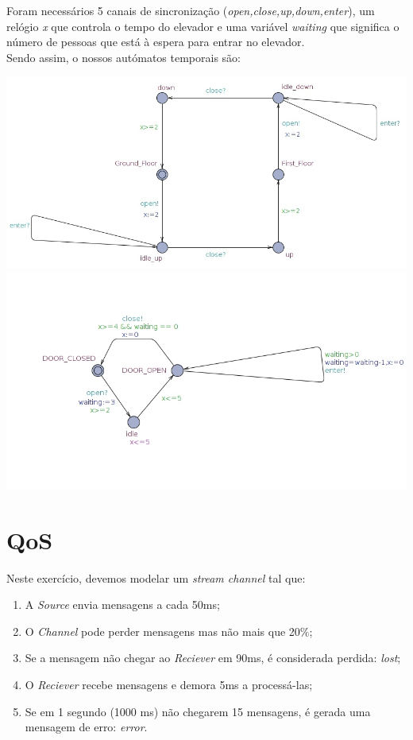 \documentclass[12pt]{article} %
\begin{document}
Foram necessários 5 canais de sincronização ({\it{open,close,up,down,enter}}), um relógio {\it{x}} que controla o tempo do elevador e uma variável {\it{waiting}} que significa o número de pessoas que está à espera para entrar no elevador.
\\
Sendo assim, o nossos autómatos temporais são:
\begin{center}
\includegraphics[scale=0.4]{elevator.jpg}
\includegraphics[scale=0.4]{door.jpg}
\end{center}


\section{QoS} 

Neste exercício, devemos modelar um {\it{stream channel}} tal que:
\begin{enumerate}
\item A {\it{Source}} envia mensagens a cada 50ms;
\item O {\it{Channel}} pode perder mensagens mas não mais que 20$\%$;
\item Se a mensagem não chegar ao {\it{Reciever}} em 90ms, é considerada perdida: {\it{lost}};
\item O {\it{Reciever}} recebe mensagens e demora 5ms a processá-las;
\item Se em 1 segundo (1000 ms) não chegarem 15 mensagens, é gerada uma mensagem de erro: {\it{error}}.
\end{enumerate}
\end{document}
